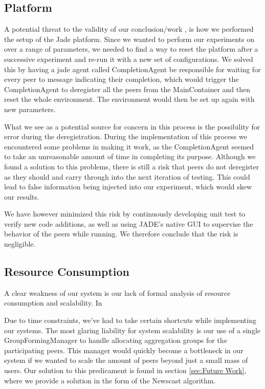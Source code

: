 \subsection{Platform}
A potential threat to the validity of our conclusion/work , is how we performed the setup of the Jade platform. Since we wanted to perform our experiments on over a range of parameters, we needed to find a way to reset the platform after a successive experiment and re-run it with a new set of configurations. We solved this by having a jade agent called CompletionAgent be responsible for waiting for every peer to message indicating their completion, which would trigger the CompletionAgent to deregister all the peers from the MainContainer and then reset the whole environment. The environment would then be set up again with new parameters. 

What we see as a potential source for concern in this process is the possibility for error during the deregistration. During the implementation of this process we encountered some problems in making it work, as the CompletionAgent seemed to take an unreasonable amount of time in completing its purpose. Although we found a solution to this problems, there is still a risk that peers do not deregister as they should and carry through into the next iteration of testing. This could lead to false information being injected into our experiment, which would skew our results.  

We have however minimized this risk by continuously developing unit test to verify new code additions, as well as using JADE's native GUI to supervise the behavior of the peers while running. We therefore conclude that the risk is negligible.

\subsection{Resource Consumption}
A clear weakness of our system is our lack of formal analysis of resource consumption and scalability. In 

Due to time constraints, we've had to take certain shortcuts while implementing our systems. The most glaring liability for system scalability is our use of a single GroupFormingManager to handle allocating aggregation groups for the participating peers. This manager would quickly become a bottleneck in our system if we wanted to scale the amount of peers beyond just a small mass of users. Our solution to this predicament is found in section \ref{sec:Future Work}, where we provide a solution in the form of the Newscast algorithm. 

